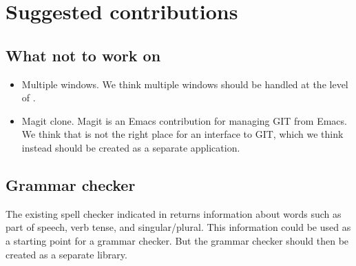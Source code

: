 \chapter{Suggested contributions}

\section{What not to work on}

\begin{itemize}
\item Multiple windows.  We think multiple windows should be handled
  at the level of \mcclim{}.
\item Magit clone.  Magit is an Emacs contribution for managing GIT
  from Emacs.  We think that \sysname{} is not the right place for an
  interface to GIT, which we think instead should be created as a
  separate \clim{} application.
\end{itemize}

\section{Grammar checker}

The existing spell checker indicated in
 returns information
about words such as part of speech, verb tense, and singular/plural.
This information could be used as a starting point for a grammar
checker.  But the grammar checker should then be created as a separate
library.
